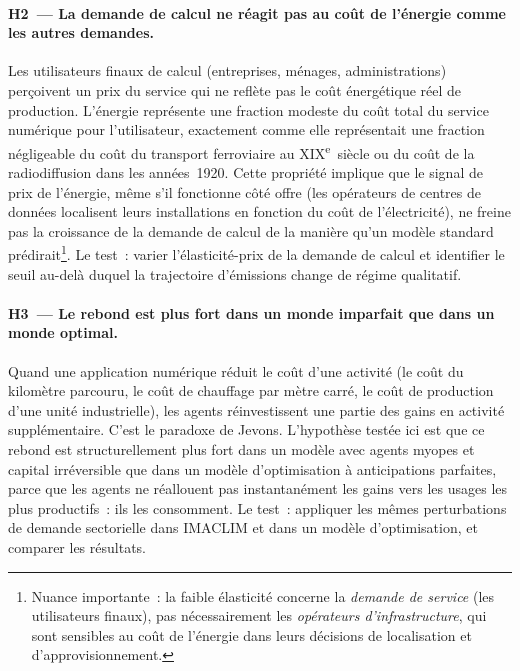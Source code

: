 \paragraph{H2~--- La demande de calcul ne réagit pas au coût de l'énergie comme les autres demandes.}
Les utilisateurs finaux de calcul (entreprises, ménages, administrations) perçoivent un prix du service qui ne reflète pas le coût énergétique réel de production. L'énergie représente une fraction modeste du coût total du service numérique pour l'utilisateur, exactement comme elle représentait une fraction négligeable du coût du transport ferroviaire au XIX\textsuperscript{e}~siècle ou du coût de la radiodiffusion dans les années~1920. Cette propriété implique que le signal de prix de l'énergie, même s'il fonctionne côté offre (les opérateurs de centres de données localisent leurs installations en fonction du coût de l'électricité), ne freine pas la croissance de la demande de calcul de la manière qu'un modèle standard prédirait\footnote{Nuance importante~: la faible élasticité concerne la \emph{demande de service} (les utilisateurs finaux), pas nécessairement les \emph{opérateurs d'infrastructure}, qui sont sensibles au coût de l'énergie dans leurs décisions de localisation et d'approvisionnement.}. Le test~: varier l'élasticité-prix de la demande de calcul et identifier le seuil au-delà duquel la trajectoire d'émissions change de régime qualitatif.

\paragraph{H3~--- Le rebond est plus fort dans un monde imparfait que dans un monde optimal.}
Quand une application numérique réduit le coût d'une activité (le coût du kilomètre parcouru, le coût de chauffage par mètre carré, le coût de production d'une unité industrielle), les agents réinvestissent une partie des gains en activité supplémentaire. C'est le paradoxe de Jevons. L'hypothèse testée ici est que ce rebond est structurellement plus fort dans un modèle avec agents myopes et capital irréversible que dans un modèle d'optimisation à anticipations parfaites, parce que les agents ne réallouent pas instantanément les gains vers les usages les plus productifs~: ils les consomment. Le test~: appliquer les mêmes perturbations de demande sectorielle dans IMACLIM et dans un modèle d'optimisation, et comparer les résultats.

